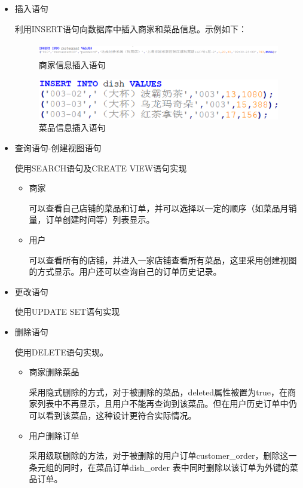 \documentclass[12pt, oneside,a4paper]{article}
\begin{document}
\begin{itemize}
 \item 插入语句
  \par\setlength{\parindent}{1em}\normalsize 利用INSERT语句向数据库中插入商家和菜品信息。示例如下：
  \begin{figure}[H]
    \raggedright
     \includegraphics[width=16cm,height=0.6cm]{insert1.png}
     \caption{\small{商家信息插入语句}}\label{fig:dummy}
  \end{figure}
  \begin{figure}[H]
    \raggedright
     \includegraphics{insert2.png}
     \caption{\small{菜品信息插入语句}}\label{fig:dummy}
  \end{figure}
 \item 查询语句-创建视图语句
  \par\setlength{\parindent}{1em}\normalsize 使用SEARCH语句及CREATE VIEW语句实现
  \begin{itemize}
   \item 商家
    \par\setlength{\parindent}{1em}\normalsize 可以查看自己店铺的菜品和订单，并可以选择以一定的顺序（如菜品月销量，订单创建时间等）列表显示。
   \item 用户
    \par\setlength{\parindent}{1em}\normalsize 可以查看所有的店铺，并进入一家店铺查看所有菜品，这里采用创建视图的方式显示。用户还可以查询自己的订单历史记录。
  \end{itemize}
 \item 更改语句
   \par\setlength{\parindent}{1em}\normalsize 使用UPDATE SET语句实现
 \item 删除语句
   \par\setlength{\parindent}{1em}\normalsize 使用DELETE语句实现。
   \begin{itemize}
    \item 商家删除菜品
     \par\setlength{\parindent}{1em}\normalsize 采用隐式删除的方式，对于被删除的菜品，deleted属性被置为true，在商家列表中不再显示，且用户不能再查询到该菜品。但在用户历史订单中仍可以看到该菜品，这种设计更符合实际情况。
    \item 用户删除订单
     \par\setlength{\parindent}{1em}\normalsize 采用级联删除的方法，对于被删除的用户订单customer\_order，删除这一条元组的同时，在菜品订单dish\_order 表中同时删除以该订单为外键的菜品订单。
   \end{itemize}


 \end{itemize}
\end{document}
